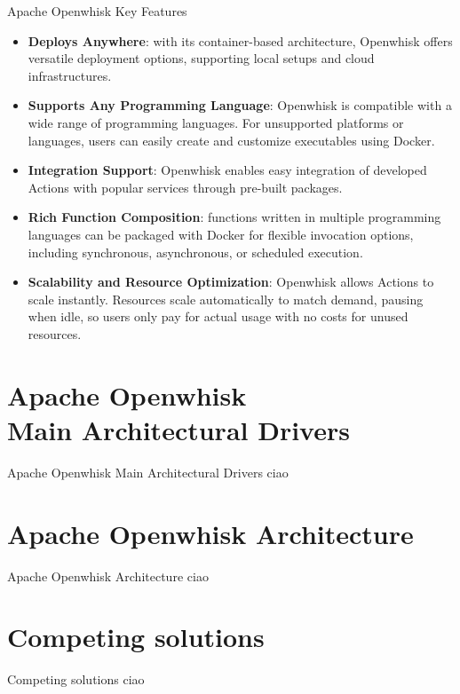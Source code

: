 \documentclass[aspectratio=169]{beamer}
\begin{document}
\begin{frame}{Apache Openwhisk Key Features}
\begin{itemize}
    \item \textbf{Deploys Anywhere}: with its container-based architecture, Openwhisk offers versatile deployment options, supporting local setups and cloud infrastructures.
    \item \textbf{Supports Any Programming Language}: Openwhisk is compatible with a wide range of programming languages. For unsupported platforms or languages, users can easily create and customize executables using Docker.
    \item \textbf{Integration Support}: Openwhisk enables easy integration of developed Actions with popular services through pre-built packages.
    \item \textbf{Rich Function Composition}: functions written in multiple programming languages can be packaged with Docker for flexible invocation options, including synchronous, asynchronous, or scheduled execution.
    \item \textbf{Scalability and Resource Optimization}: Openwhisk allows Actions to scale instantly. Resources scale automatically to match demand, pausing when idle, so users only pay for actual usage with no costs for unused resources.
\end{itemize}
\end{frame}

\section{Apache Openwhisk \\Main Architectural Drivers}
\begin{frame}{Apache Openwhisk Main Architectural Drivers}
    ciao
\end{frame}

\section{Apache Openwhisk Architecture}
\begin{frame}{Apache Openwhisk Architecture}
    ciao
\end{frame}

\section{Competing solutions}
\begin{frame}{Competing solutions}
    ciao
\end{frame}
\end{document}
